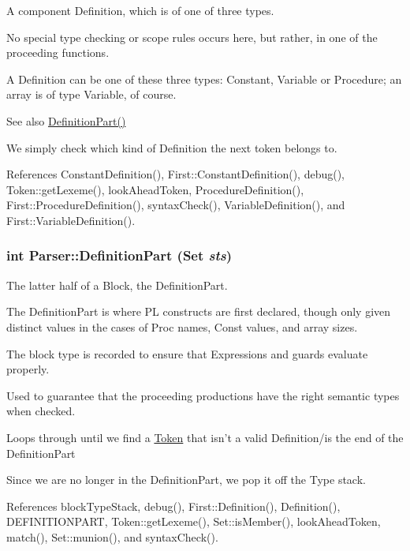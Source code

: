 A component Definition, which is of one of three types. 

No special type checking or scope rules occurs here, but rather, in one of the proceeding functions.

A Definition can be one of these three types: Constant, Variable or Procedure; an array is of type Variable, of course.

\begin{DoxySeeAlso}{See also}
\hyperlink{classParser_abc03fca869e43a1e72a28422fb96b8cb}{DefinitionPart()} 
\end{DoxySeeAlso}


We simply check which kind of Definition the next token belongs to. 



References ConstantDefinition(), First::ConstantDefinition(), debug(), Token::getLexeme(), lookAheadToken, ProcedureDefinition(), First::ProcedureDefinition(), syntaxCheck(), VariableDefinition(), and First::VariableDefinition().

\hypertarget{classParser_abc03fca869e43a1e72a28422fb96b8cb}{
\subsubsection[{DefinitionPart}]{\setlength{\rightskip}{0pt plus 5cm}int Parser::DefinitionPart ({\bf Set} {\em sts})}}
\label{classParser_abc03fca869e43a1e72a28422fb96b8cb}


The latter half of a Block, the DefinitionPart. 

The DefinitionPart is where PL constructs are first declared, though only given distinct values in the cases of Proc names, Const values, and array sizes.

The block type is recorded to ensure that Expressions and guards evaluate properly. 

Used to guarantee that the proceeding productions have the right semantic types when checked.

Loops through until we find a \hyperlink{classToken}{Token} that isn't a valid Definition/is the end of the DefinitionPart

Since we are no longer in the DefinitionPart, we pop it off the Type stack. 



References blockTypeStack, debug(), First::Definition(), Definition(), DEFINITIONPART, Token::getLexeme(), Set::isMember(), lookAheadToken, match(), Set::munion(), and syntaxCheck().

